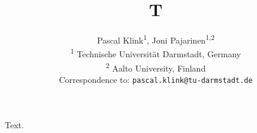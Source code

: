 \documentclass{article}
\author{%
  Pascal Klink\textsuperscript{1}, Joni Pajarinen\textsuperscript{1,2}\\
  \textsuperscript{1} Technische Universit\"at Darmstadt, Germany \\
  \textsuperscript{2} Aalto University, Finland \\
  Correspondence to: \texttt{pascal.klink@tu-darmstadt.de}
}
\title{T}
\begin{document}
\maketitle
Text.
\end{document}

